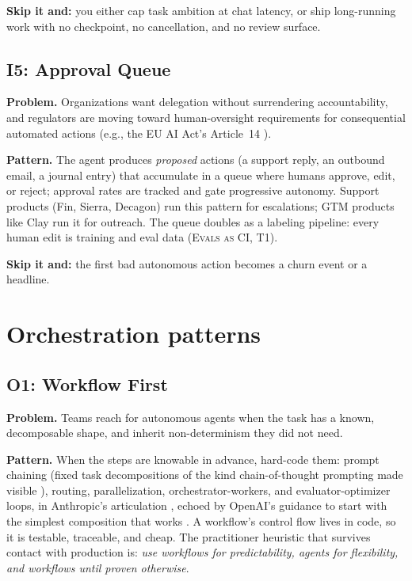 \documentclass[11pt]{article}
\newcommand{\pat}[1]{\textsc{#1}}
\begin{document}
\textbf{Skip it and:} you either cap task ambition at chat latency, or ship
long-running work with no checkpoint, no cancellation, and no review surface.

\subsection{I5: Approval Queue}

\textbf{Problem.} Organizations want delegation without surrendering
accountability, and regulators are moving toward human-oversight requirements
for consequential automated actions (e.g., the EU AI Act's Article~14
\citep{euact2024}).

\textbf{Pattern.} The agent produces \emph{proposed} actions (a support reply,
an outbound email, a journal entry) that accumulate in a queue where humans
approve, edit, or reject; approval rates are tracked and gate progressive
autonomy. Support products (Fin, Sierra, Decagon) run this pattern for
escalations; GTM products like Clay run it for outreach. The queue doubles as
a labeling pipeline: every human edit is training and eval data
(\pat{Evals as CI}, T1).

\textbf{Skip it and:} the first bad autonomous action becomes a churn event or
a headline.

\section{Orchestration patterns}
\label{sec:orch}

\subsection{O1: Workflow First}

\textbf{Problem.} Teams reach for autonomous agents when the task has a known,
decomposable shape, and inherit non-determinism they did not need.

\textbf{Pattern.} When the steps are knowable in advance, hard-code them:
prompt chaining (fixed task decompositions of the kind chain-of-thought
prompting made visible \citep{wei2022cot}), routing, parallelization,
orchestrator-workers, and
evaluator-optimizer loops, in Anthropic's articulation
\citep{anthropic2024agents}, echoed by OpenAI's guidance to start with the
simplest composition that works \citep{openai2025agentsguide}. A workflow's
control flow lives in code, so it is testable, traceable, and cheap. The
practitioner heuristic that survives contact with production is: \emph{use
workflows for predictability, agents for flexibility, and workflows until
proven otherwise}.
\end{document}
